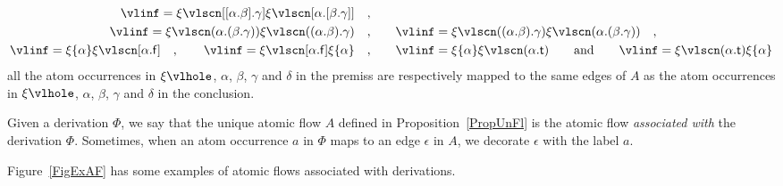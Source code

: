 \documentclass[a4paper]{LMCS}
\begin{document}
\begin{prop}
\begin{enumerate}
\[\begin{array}{@{}r@{}l@{}}
\vlinf={}{\xi\vlscn[[\alpha.\beta].\gamma]}
         {\xi\vlscn[\alpha.[\beta.\gamma]]}                \quad,      \\
\noalign{\smallskip}
\vlinf={}{\xi\vlscn(\alpha.(\beta.\gamma))}
         {\xi\vlscn((\alpha.\beta).\gamma)}                \quad,&\qquad
\vlinf={}{\xi\vlscn((\alpha.\beta).\gamma)}
         {\xi\vlscn(\alpha.(\beta.\gamma))}                \quad,      \\
\noalign{\smallskip}
\vlinf={}{\xi\{\alpha\}}{\xi\vlscn[\alpha.{\mathsf f}]}           \quad,\qquad
\vlinf={}{\xi\vlscn[\alpha.{\mathsf f}]}{\xi\{\alpha\}}           \quad,&\qquad
\vlinf={}{\xi\{\alpha\}}{\xi\vlscn(\alpha.{\mathsf t})}        \qquad\hbox{and\/}\qquad
\vlinf={}{\xi\vlscn(\alpha.{\mathsf t})}{\xi\{\alpha\}}
\end{array}
\]
all the atom occurrences in $\xi\vlhole$, $\alpha$, $\beta$, $\gamma$ and $\delta$ in the premiss are respectively mapped to the same edges of $A$ as the atom occurrences in $\xi\vlhole$, $\alpha$, $\beta$, $\gamma$ and $\delta$ in the conclusion.
\end{enumerate}
\end{prop}

\begin{defi}
Given a derivation $\Phi$, we say that the unique atomic flow $A$ defined in Proposition~\ref{PropUnFl} is the atomic flow \emph{associated with} the derivation $\Phi$. Sometimes, when an atom occurrence $a$ in $\Phi$ maps to an edge $\epsilon$ in $A$, we decorate $\epsilon$ with the label $a$.
\end{defi}

\begin{exa}
Figure~\ref{FigExAF} has some examples of atomic flows associated with derivations.
\end{exa}
\end{document}
